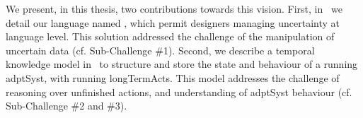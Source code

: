 We present, in this thesis, two contributions towards this vision.
First, in~ we detail our language named \langName{}, which permit designers managing uncertainty at language level.
This solution addressed the challenge of the manipulation of uncertain data (cf. Sub-Challenge \#1). 
Second, we describe a temporal knowledge model in~ to structure and store the state and behaviour of a running \gls{adptSyst}, with running \glspl{longTermAct}.
This model addresses the challenge of reasoning over unfinished actions, and understanding of \gls{adptSyst} \gls{behaviour} (cf. Sub-Challenge \#2 and \#3).


